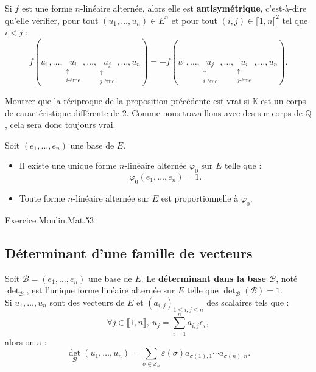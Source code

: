 \documentclass[french]{article}
\newcommand{\Q}{\mathbb{Q}}
\newcommand{\K}{\mathbb{K}}
\theoremstyle{plain}
\theoremstyle{definition}
\theoremstyle{remark}
\begin{document}
\begin{prop}%
	Si $f$ est une forme $n$-linéaire alternée, alors elle est \textbf{antisymétrique}, c'est-à-dire qu'elle vérifier, pour tout $(u_1,\ldots,u_n)\in E^n$ et pour tout $(i,j)\in\llbracket1,n\rrbracket^2$ tel que $i<j$ :
	$$f(u_1,\ldots,\underset{\substack{\uparrow\\i\text{-ème}}}{u_i},\ldots,\underset{\substack{\uparrow\\j\text{-ème}}}{u_j},\ldots,u_n)=-f(u_1,\ldots,\underset{\substack{\uparrow\\i\text{-ème}}}{u_j},\ldots,\underset{\substack{\uparrow\\j\text{-ème}}}{u_i},\ldots,u_n).$$
\end{prop}

\begin{exo}
	Montrer que la réciproque de la proposition précédente est vrai si $\K$ est un corps de caractéristique différente de $2$. Comme nous travaillons avec des sur-corps de $\Q$, cela sera donc toujours vrai.
\end{exo}

\begin{thm}%
	Soit $(e_1,\ldots,e_n)$ une base de $E$.
	\begin{itemize}
		\item Il existe une unique forme $n$-linéaire alternée $\varphi_0$ sur $E$ telle que :
		$$\varphi_0(e_1,\ldots,e_n)=1.$$
		\item Toute forme $n$-linéaire alternée sur $E$ est proportionnelle à $\varphi_0$.
	\end{itemize}
\end{thm}

Exercice Moulin.Mat.53

\subsection{Déterminant d'une famille de vecteurs}

\begin{dfn}
	Soit $\mathcal{B}=(e_1,\ldots,e_n)$ une base de $E$. Le \textbf{déterminant dans la base $\mathcal{B}$}, noté $\det_\mathcal{B}$, est l'unique forme linéaire alternée sur $E$ telle que $\det_\mathcal{B}(\mathcal{B})=1$.\\
	Si $u_1,\ldots,u_n$ sont des vecteurs de $E$ et $(a_{i,j})_{1\leqslant i,j\leqslant n}$ des scalaires tels que :
	$$\forall j\in\llbracket1,n\rrbracket,\ u_j=\sum_{i=1}^{n}a_{i,j}e_i,$$ alors on a :
	$$\det_\mathcal{B}(u_1,\ldots,u_n)=\sum_{\sigma\in\mathcal{S}_n}\varepsilon(\sigma)a_{\sigma(1),1}\cdots a_{\sigma(n),n}.$$
\end{dfn}
\end{document}
